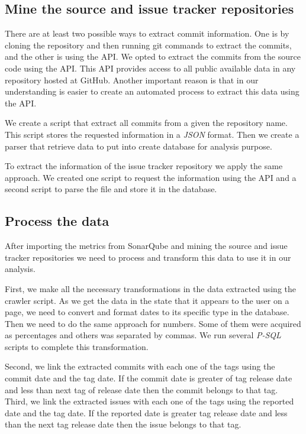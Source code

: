 \subsection{Mine the source and issue tracker repositories}

There are at least two possible ways to extract commit information. One is by cloning the repository and then running git commands to extract the commits, and the other is using the API. We opted to extract the commits from the source code using the API. This API provides access to all public available data in any repository hosted at GitHub. Another important reason is that in our understanding is easier to create an automated process to extract this data using the API. 

We create a script that extract all commits from a given the repository name. This script stores the requested information in a \textit{JSON} format. Then we create a parser that retrieve data to put into create database for analysis purpose.

To extract the information of the issue tracker repository we apply the same approach. We created one script to request the information using the API and a second script to parse the file and store it in the database.

\subsection{Process the data}
After importing the metrics from SonarQube and mining the source and issue tracker repositories we need to process and transform this data to use it in our analysis. 

First, we make all the necessary transformations in the data extracted using the crawler script. As we get the data in the state that it appears to the user on a page, we need to convert and format dates to its specific type in the database. Then we need to do the same approach for numbers. Some of them were acquired as percentages and others was separated by commas. We run several \textit{P-SQL} scripts to complete this transformation.

Second, we link the extracted commits with each one of the tags using the commit date and the tag date. If the commit date is greater of tag release date and less than next tag of release date then the commit belongs to that tag. Third, we link the extracted issues with each one of the tags using the reported date and the tag date. If the reported date is greater  tag release date and less than the next tag release date then the issue belongs to that tag.